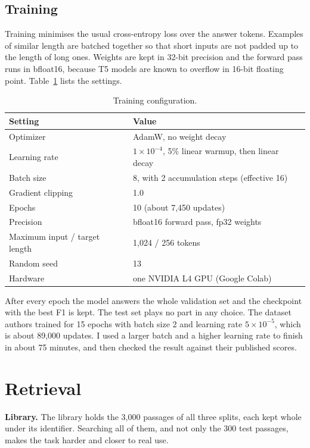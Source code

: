 \subsection{Training}

Training minimises the usual cross-entropy loss over the answer tokens. Examples of similar length are batched together so that short inputs are not padded up to the length of long ones. Weights are kept in 32-bit precision and the forward pass runs in bfloat16, because T5 models are known to overflow in 16-bit floating point. Table~\ref{tab:train-config} lists the settings.

\begin{table}[H]
	\centering
	\caption{Training configuration.}
	\label{tab:train-config}
	\begin{tabular}{ll}
		\toprule
		Setting & Value \\
		\midrule
		Optimizer & AdamW, no weight decay \\
		Learning rate & $1\times10^{-4}$, 5\% linear warmup, then linear decay \\
		Batch size & 8, with 2 accumulation steps (effective 16) \\
		Gradient clipping & 1.0 \\
		Epochs & 10 (about 7,450 updates) \\
		Precision & bfloat16 forward pass, fp32 weights \\
		Maximum input / target length & 1,024 / 256 tokens \\
		Random seed & 13 \\
		Hardware & one NVIDIA L4 GPU (Google Colab) \\
		\bottomrule
	\end{tabular}
\end{table}

After every epoch the model answers the whole validation set and the checkpoint with the best F1 is kept. The test set plays no part in any choice. The dataset authors trained for 15 epochs with batch size 2 and learning rate $5\times10^{-5}$, which is about 89,000 updates. I used a larger batch and a higher learning rate to finish in about 75 minutes, and then checked the result against their published scores.

\section{Retrieval}

\textbf{Library.} The library holds the 3,000 passages of all three splits, each kept whole under its identifier. Searching all of them, and not only the 300 test passages, makes the task harder and closer to real use.

